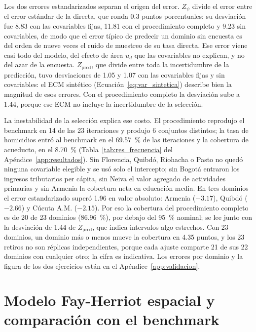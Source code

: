 Los dos errores estandarizados separan el origen del error. $Z_{\psi}$ divide el error entre el error estándar de la directa, que ronda 0.3 puntos porcentuales: su desviación fue 8.83 con las covariables fijas, 11.81 con el procedimiento completo y 9.23 sin covariables, de modo que el error típico de predecir un dominio sin encuesta es del orden de nueve veces el ruido de muestreo de su tasa directa. Ese error viene casi todo del modelo, del efecto de área $u_d$ que las covariables no explican, y no del azar de la encuesta. $Z_{\text{pred}}$, que divide entre toda la incertidumbre de la predicción, tuvo desviaciones de 1.05 y 1.07 con las covariables fijas y sin covariables: el ECM sintético (Ecuación~\ref{eq:var_sintetica}) describe bien la magnitud de esos errores. Con el procedimiento completo la desviación sube a 1.44, porque ese ECM no incluye la incertidumbre de la selección.

La inestabilidad de la selección explica ese costo. El procedimiento reprodujo el benchmark en 14 de las 23 iteraciones y produjo 6 conjuntos distintos; la tasa de homicidios entró al benchmark en el 69.57~\% de las iteraciones y la cobertura de acueducto, en el 8.70~\% (Tabla~\ref{tab:res_frecuencia} del Apéndice~\ref{app:resultados}). Sin Florencia, Quibdó, Riohacha o Pasto no quedó ninguna covariable elegible y se usó solo el intercepto; sin Bogotá entraron los ingresos tributarios per cápita, sin Neiva el valor agregado de actividades primarias y sin Armenia la cobertura neta en educación media. En tres dominios el error estandarizado superó 1.96 en valor absoluto: Armenia ($-3.17$), Quibdó ($-2.66$) y Cúcuta A.M. ($-2.15$). Por eso la cobertura del procedimiento completo es de 20 de 23 dominios (86.96~\%), por debajo del 95~\% nominal; se lee junto con la desviación de 1.44 de $Z_{\text{pred}}$, que indica intervalos algo estrechos. Con 23 dominios, un dominio más o menos mueve la cobertura en 4.35 puntos, y los 23 retiros no son réplicas independientes, porque cada ajuste comparte 21 de sus 22 dominios con cualquier otro; la cifra es indicativa. Los errores por dominio y la figura de los dos ejercicios están en el Apéndice~\ref{app:validacion}.

\section{Modelo Fay-Herriot espacial y comparación con el benchmark}
\label{sec:res_espacial}

